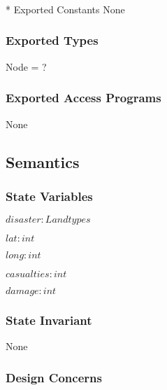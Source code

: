 \documentclass[12pt]{article}
\begin{document}
                \subsubsection{}* {Exported Constants}
                None
                \subsubsection* {Exported Types}
                Node = ?

                
                \subsubsection* {Exported Access Programs}
                None
                
                \subsection* {Semantics}
                
                \subsubsection* {State Variables}
                
                $disaster: Landtypes$
                
                $lat: int$
                
                $long: int$
                
                $casualties: int$
                
                $damage: int$
                
                \subsubsection* {State Invariant}
                None
                \subsubsection* {Design Concerns}
                
                \newpage
\end{document}
